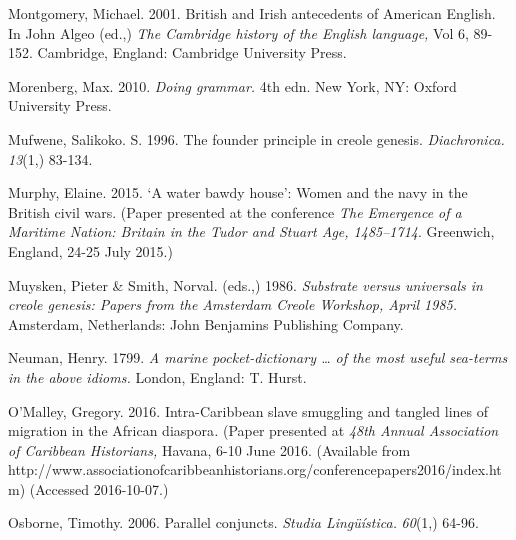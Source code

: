 \begin{styleStandard}
Montgomery, Michael. 2001. British and Irish antecedents of American English. In John Algeo (ed.,) \textit{The Cambridge history of the English language, }Vol 6, 89-152. Cambridge, England: Cambridge University Press.
\end{styleStandard}

\begin{styleStandard}
Morenberg, Max. 2010. \textit{Doing grammar.} 4th edn. New York, NY: Oxford University Press.
\end{styleStandard}

\begin{styleStandard}
Mufwene, Salikoko. S. 1996. The founder principle in creole genesis. \textit{Diachronica. 13}(1,) 83{}-134.
\end{styleStandard}

\begin{styleStandard}
Murphy, Elaine. 2015. ‘A water bawdy house’: Women and the navy in the British civil wars. (Paper presented at the conference \textit{The Emergence of a Maritime Nation: Britain in the Tudor and Stuart Age, 1485–1714}. Greenwich, England, 24-25 July 2015.)
\end{styleStandard}

\begin{styleStandard}
Muysken, Pieter \& Smith, Norval. (eds.,) 1986. \textit{Substrate versus universals in creole genesis: Papers from the Amsterdam Creole Workshop, April 1985. }Amsterdam, Netherlands: John Benjamins Publishing Company.
\end{styleStandard}

\begin{styleStandard}
Neuman, Henry. 1799. \textit{A marine pocket-dictionary … of the most useful sea-terms in the above idioms.} London, England: T. Hurst.
\end{styleStandard}

\begin{styleStandard}
O’Malley, Gregory. 2016. Intra-Caribbean slave smuggling and tangled lines of migration in the African diaspora\textit{. }(Paper presented at \textit{48th Annual Association of Caribbean Historians,} Havana, 6-10 June 2016. (Available from http://www.associationofcaribbeanhistorians.org/conferencepapers2016/index.htm) (Accessed 2016-10-07.)
\end{styleStandard}

\begin{styleStandard}
Osborne, Timothy. 2006. Parallel conjuncts. \textit{Studia Lingüística.} \textit{60}(1,) 64-96. 
\end{styleStandard}

